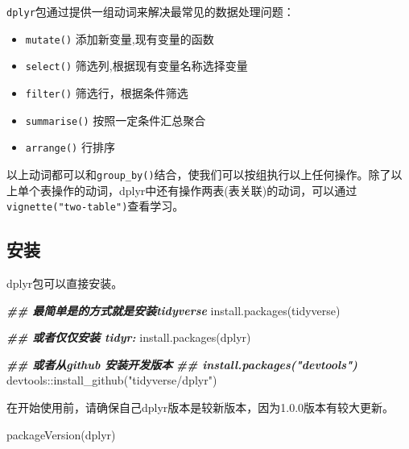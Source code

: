 \documentclass[
]{book}
\newenvironment{Shaded}{\begin{snugshade}}{\end{snugshade}}
\newcommand{\DocumentationTok}[1]{\textcolor[rgb]{0.56,0.35,0.01}{\textbf{\textit{#1}}}}
\newcommand{\FunctionTok}[1]{\textcolor[rgb]{0.00,0.00,0.00}{#1}}
\newcommand{\NormalTok}[1]{#1}
\newcommand{\SpecialCharTok}[1]{\textcolor[rgb]{0.00,0.00,0.00}{#1}}
\newcommand{\StringTok}[1]{\textcolor[rgb]{0.31,0.60,0.02}{#1}}
\begin{document}
\texttt{dplyr}包通过提供一组动词来解决最常见的数据处理问题：

\begin{itemize}
\item
  \texttt{mutate()} 添加新变量,现有变量的函数
\item
  \texttt{select()} 筛选列,根据现有变量名称选择变量
\item
  \texttt{filter()} 筛选行，根据条件筛选
\item
  \texttt{summarise()} 按照一定条件汇总聚合
\item
  \texttt{arrange()} 行排序
\end{itemize}

以上动词都可以和\texttt{group\_by()}结合，使我们可以按组执行以上任何操作。除了以上单个表操作的动词，dplyr中还有操作两表(表关联)的动词，可以通过\texttt{vignette("two-table")}查看学习。

\hypertarget{dplyr:install-package}{%
\subsection{安装}\label{dplyr:install-package}}

dplyr包可以直接安装。

\begin{Shaded}
\begin{Highlighting}[]
\DocumentationTok{\#\# 最简单是的方式就是安装tidyverse}
\FunctionTok{install.packages}\NormalTok{(}\StringTok{\textquotesingle{}tidyverse\textquotesingle{}}\NormalTok{)}

\DocumentationTok{\#\# 或者仅仅安装 tidyr:}
\FunctionTok{install.packages}\NormalTok{(}\StringTok{\textquotesingle{}dplyr\textquotesingle{}}\NormalTok{)}

\DocumentationTok{\#\# 或者从github 安装开发版本}
\DocumentationTok{\#\# install.packages("devtools")}
\NormalTok{devtools}\SpecialCharTok{::}\FunctionTok{install\_github}\NormalTok{(}\StringTok{"tidyverse/dplyr"}\NormalTok{)}
\end{Highlighting}
\end{Shaded}

在开始使用前，请确保自己dplyr版本是较新版本，因为1.0.0版本有较大更新。

\begin{Shaded}
\begin{Highlighting}[]
\FunctionTok{packageVersion}\NormalTok{(}\StringTok{\textquotesingle{}dplyr\textquotesingle{}}\NormalTok{)}
\end{Highlighting}
\end{Shaded}
\end{document}
